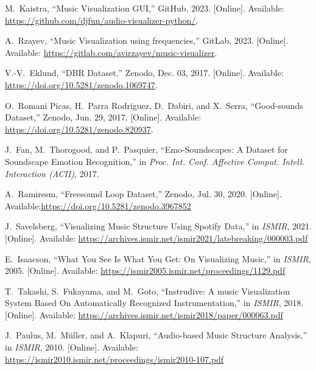 \documentclass{article}
\begin{document}
\newpage
\begin{thebibliography}{citations}


M.~Kaistra, ``Music Visualization GUI,'' GitHub, 2023. [Online]. Available: \url{https://github.com/djfun/audio-visualizer-python/}.

A.~Rzayev, ``Music Visualization using frequencies,'' GitLab, 2023. [Online]. Available: \url{https://gitlab.com/avirzayev/music-visualizer}.

V.-V.~Eklund, ``DBR Dataset,'' Zenodo, Dec. 03, 2017. [Online]. Available: \url{https://doi.org/10.5281/zenodo.1069747}.

O.~Romani Picas, H.~Parra Rodriguez, D.~Dabiri, and X.~Serra, ``Good-sounds Dataset,'' Zenodo, Jun. 29, 2017. [Online]. Available: \url{https://doi.org/10.5281/zenodo.820937}.

J.~Fan, M.~Thorogood, and P.~Pasquier, ``Emo-Soundscapes: A Dataset for Soundscape Emotion Recognition,'' in \emph{Proc. Int. Conf. Affective Comput. Intell. Interaction (ACII)}, 2017.

A.~Ramiresm, ``Freesound Loop Dataset,'' Zenodo, Jul. 30, 2020. [Online]. Available:\url{https://doi.org/10.5281/zenodo.3967852}

J.~Savelsberg, ``Visualizing Music Structure Using Spotify Data,''
in {\em ISMIR}, 2021. [Online]. Available: \url{https://archives.ismir.net/ismir2021/latebreaking/000003.pdf}

E.~Isaacson, ``What You See Is What You Get: On Visualizing Music,''
in {\em ISMIR}, 2005. [Online]. Available: \url{https://ismir2005.ismir.net/proceedings/1129.pdf}

T.~Takashi, S.~Fukayama, and M.~Goto, ``Instrudive: A music Visualization System Based On Automatically Recognized Instrumentation,''
in {\em ISMIR}, 2018. [Online]. Available: \url{https://archives.ismir.net/ismir2018/paper/000063.pdf}

J.~Paulus, M.~M\"uller, and A.~Klapuri, ``Audio-based Music Structure Analysis,''
in {\em ISMIR}, 2010. [Online]. Available: \url{https://ismir2010.ismir.net/proceedings/ismir2010-107.pdf}


\end{thebibliography}
\end{document}
